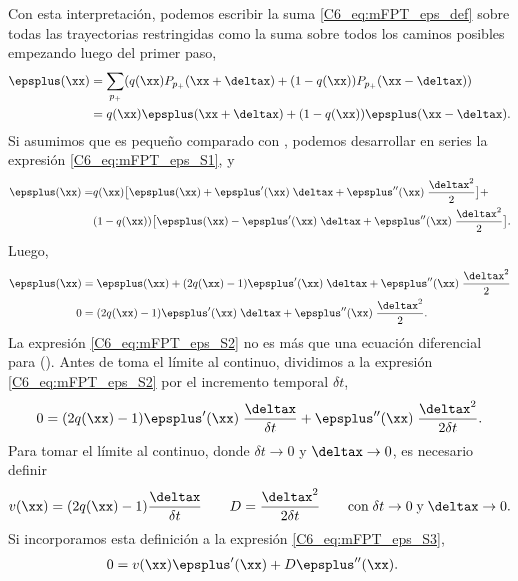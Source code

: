 {Con esta interpretación, podemos escribir la suma \ref{C6_eq:mFPT_eps_def} sobre todas las trayectorias restringidas como la suma sobre todos los caminos posibles empezando luego del primer paso,
\begin{align}
    \epsplus(\xx) &= \sum_{p_{+}} ( q(\xx) P_{p_{+}}(\xx + \deltax) + (1-q(\xx)) P_{p_{+}}(\xx - \deltax)) \\
    & = q(\xx) \epsplus(\xx+\deltax) +  (1-q(\xx)) \epsplus(\xx - \deltax) 
    \label{C6_eq:mFPT_eps_S1}.
\end{align}
Si asumimos que \deltax es pequeño comparado con \xx, podemos desarrollar en series la expresión \ref{C6_eq:mFPT_eps_S1}, y
\begin{align}
    \epsplus(\xx) = & q(\xx) \big[  \epsplus(\xx) + \epsplus'(\xx) \; \deltax + \epsplus''(\xx) \; \frac{\deltax^2}{2} \big] + \nonumber \\  & (1-q(\xx)) \big[  \epsplus(\xx) - \epsplus'(\xx) \; \deltax + \epsplus''(\xx) \; \frac{\deltax^2}{2} \big].
\end{align}
Luego,
\begin{align}
    \epsplus(\xx) &=  \epsplus(\xx) + (2q(\xx)-1) \epsplus'(\xx) \; \deltax + \epsplus''(\xx) \; \frac{\deltax^2}{2} \\
    0 &=  (2q(\xx)-1) \epsplus'(\xx) \; \deltax + \epsplus''(\xx) \; \frac{\deltax^2}{2}. \label{C6_eq:mFPT_eps_S2}
\end{align}
La expresión \ref{C6_eq:mFPT_eps_S2} no es más que una ecuación diferencial para \epsplus(\xx). Antes de toma el límite al continuo, dividimos a la expresión \ref{C6_eq:mFPT_eps_S2} por el incremento temporal $\delta t$,
\begin{align}
     0 =  (2q(\xx)-1) \epsplus'(\xx) \; \frac{\deltax}{\delta t} + \epsplus''(\xx) \; \frac{\deltax^2}{2 \delta t}. 
     \label{C6_eq:mFPT_eps_S3}
\end{align}
Para tomar el límite al continuo, donde $\delta t \rightarrow   0 $ y $\deltax \rightarrow 0$, es necesario definir
\begin{equation}
    v(\xx) = (2q(\xx)-1) \frac{\deltax}{\delta t} \qquad D = \frac{\deltax^2}{2 \delta t} \qquad \text{con} \; \delta t \rightarrow   0 \; \text{y} \; \deltax \rightarrow 0 .
    \label{C6_eq:mFPT_eps_def_vD}
\end{equation}
Si incorporamos esta definición a la expresión \ref{C6_eq:mFPT_eps_S3},
\begin{align}
     0 &=  v(\xx) \epsplus'(\xx) + D \epsplus''(\xx) .
     \label{C6_eq:mFPT_eps_S4}
\end{align}
}
